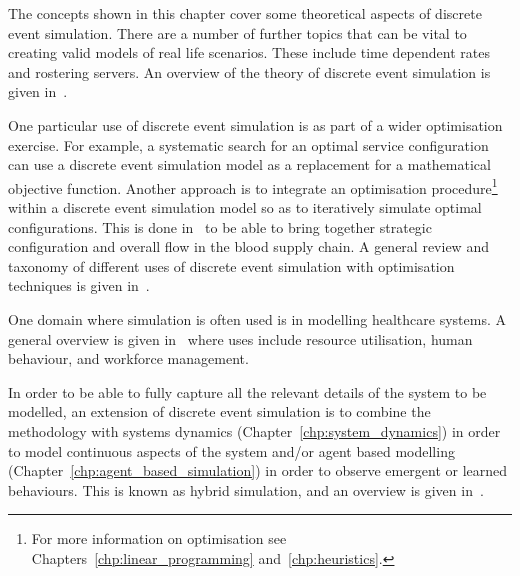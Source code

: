 The concepts shown in this chapter cover some theoretical aspects of discrete
event simulation. There are a number of further topics that can be vital to
creating valid models of real life scenarios. These include time dependent
rates and rostering servers.
An overview of the theory of discrete event simulation is
given in~\cite{robinson2004simulation}.

One particular use of discrete event simulation is as part of a wider
optimisation exercise. For example, a systematic search for
an optimal service configuration can use a discrete event simulation model as a
replacement for a mathematical objective function. Another approach is to
integrate an optimisation procedure\footnote{For more information on
optimisation see Chapters~\ref{chp:linear_programming} and~\ref{chp:heuristics}.}
within a discrete event simulation model so as to iteratively simulate optimal
configurations. This is done in~\cite{osorio2017simulation} to be able to
bring together strategic configuration and overall flow in the blood supply
chain. A general review and taxonomy of different uses of discrete event
simulation with optimisation techniques is given in~\cite{figueira2014hybrid}.

One domain where simulation is often used is in modelling
healthcare systems.
A general overview is given in~\cite{brailsford2009analysis} where uses
include resource utilisation, human behaviour, and workforce management.

In order to be able to fully capture all the relevant details of the system to
be modelled, an extension of discrete event simulation is to combine the
methodology with systems dynamics
(Chapter~\ref{chp:system_dynamics}) in order to model continuous aspects of the
system and/or agent based modelling
(Chapter~\ref{chp:agent_based_simulation}) in order to observe
emergent or learned behaviours. This is known as
hybrid simulation, and an overview is given
in~\cite{brailsford2019hybrid}.
